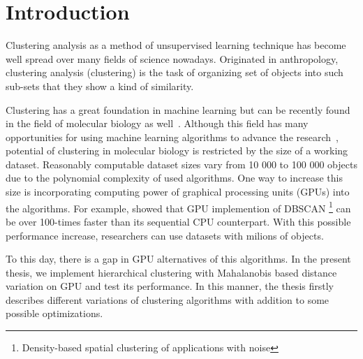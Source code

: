 \chapter*{Introduction}


Clustering analysis as a method of unsupervised learning technique has become well spread over many fields of science nowadays. Originated in anthropology, clustering analysis (clustering) is the task of organizing set of objects into such sub-sets that they show a kind of similarity. 

Clustering has a great foundation in machine learning but can be recently found in the field of molecular biology as well~\cite{Nugent2010}. Although this field has many opportunities for using machine learning algorithms to advance the research~\cite{btaa091}, potential of clustering in molecular biology is restricted by the size of a working dataset. Reasonably computable dataset sizes vary from 10 000 to 100 000 objects due to the polynomial complexity of used algorithms. One way to increase this size is incorporating computing power of graphical processing units (GPUs) into the algorithms. For example, \citet{andrade2013g} showed that GPU implemention of DBSCAN \footnote{Density-based spatial clustering of applications with noise} can be over 100-times faster than its sequential CPU counterpart. With this possible performance increase, researchers can use datasets with milions of objects. 

To this day, there is a gap in GPU alternatives of this algorithms. In the present thesis, we implement hierarchical clustering with Mahalanobis based distance variation on GPU and test its performance. In this manner, the thesis firstly describes different variations of clustering algorithms with addition to some possible optimizations.
